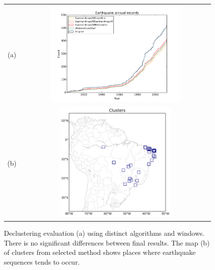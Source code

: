 \documentclass[draft, grl]{agutex}
\begin{document}
\begin{figure}
	\begin{center}
	\begin{table}[H]
		\begin{tabular}{ c c }
		\footnotesize(a)
		& \includegraphics[width=0.70\textwidth]{z_img_hmtk_bsb2014_11_decluster}
		\\
		\footnotesize(b)
        & \includegraphics[width=0.60\textwidth]{z_img_hmtk_bsb2014_11_clusters}
		\end{tabular}
	\end{table}
	\caption{Declustering evaluation (a) using distinct algorithms and windows. There is no significant differences between final results. The map (b) of clusters from selected method shows places where earthquake sequences tends to occur.}
	\label{fig_decluster}
	\end{center}
\end{figure}
\end{document}
